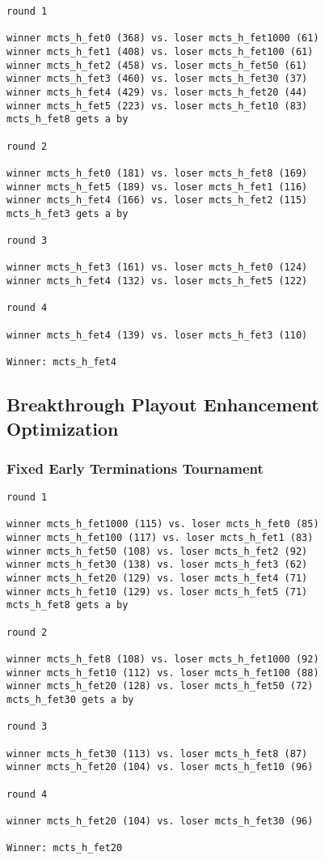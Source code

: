 \documentclass{article}
\begin{document}
\begin{verbatim}
round 1

winner mcts_h_fet0 (368) vs. loser mcts_h_fet1000 (61)
winner mcts_h_fet1 (408) vs. loser mcts_h_fet100 (61)
winner mcts_h_fet2 (458) vs. loser mcts_h_fet50 (61)
winner mcts_h_fet3 (460) vs. loser mcts_h_fet30 (37)
winner mcts_h_fet4 (429) vs. loser mcts_h_fet20 (44)
winner mcts_h_fet5 (223) vs. loser mcts_h_fet10 (83)
mcts_h_fet8 gets a by

round 2

winner mcts_h_fet0 (181) vs. loser mcts_h_fet8 (169)
winner mcts_h_fet5 (189) vs. loser mcts_h_fet1 (116)
winner mcts_h_fet4 (166) vs. loser mcts_h_fet2 (115)
mcts_h_fet3 gets a by

round 3

winner mcts_h_fet3 (161) vs. loser mcts_h_fet0 (124)
winner mcts_h_fet4 (132) vs. loser mcts_h_fet5 (122)

round 4

winner mcts_h_fet4 (139) vs. loser mcts_h_fet3 (110)

Winner: mcts_h_fet4
\end{verbatim}


\subsection{Breakthrough Playout Enhancement Optimization}

\subsubsection{Fixed Early Terminations Tournament}

\begin{verbatim}
round 1

winner mcts_h_fet1000 (115) vs. loser mcts_h_fet0 (85)
winner mcts_h_fet100 (117) vs. loser mcts_h_fet1 (83)
winner mcts_h_fet50 (108) vs. loser mcts_h_fet2 (92)
winner mcts_h_fet30 (138) vs. loser mcts_h_fet3 (62)
winner mcts_h_fet20 (129) vs. loser mcts_h_fet4 (71)
winner mcts_h_fet10 (129) vs. loser mcts_h_fet5 (71)
mcts_h_fet8 gets a by

round 2

winner mcts_h_fet8 (108) vs. loser mcts_h_fet1000 (92)
winner mcts_h_fet10 (112) vs. loser mcts_h_fet100 (88)
winner mcts_h_fet20 (128) vs. loser mcts_h_fet50 (72)
mcts_h_fet30 gets a by

round 3

winner mcts_h_fet30 (113) vs. loser mcts_h_fet8 (87)
winner mcts_h_fet20 (104) vs. loser mcts_h_fet10 (96)

round 4

winner mcts_h_fet20 (104) vs. loser mcts_h_fet30 (96)

Winner: mcts_h_fet20
\end{verbatim}
\end{document}
